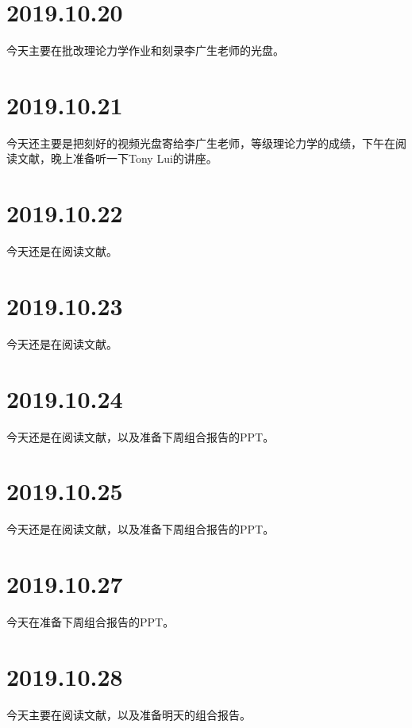 \section{2019.10.20}
今天主要在批改理论力学作业和刻录李广生老师的光盘。

\section{2019.10.21}
今天还主要是把刻好的视频光盘寄给李广生老师，等级理论力学的成绩，下午在阅读文献\cite{RN1176}，晚上准备听一下Tony Lui的讲座。

\section{2019.10.22}
今天还是在阅读文献\cite{RN1176}。

\section{2019.10.23}
今天还是在阅读文献\cite{RN1176}。

\section{2019.10.24}
今天还是在阅读文献\cite{RN1176}，以及准备下周组合报告的PPT。

\section{2019.10.25}
今天还是在阅读文献\cite{RN1176}，以及准备下周组合报告的PPT。

\section{2019.10.27}
今天在准备下周组合报告的PPT。

\section{2019.10.28}
今天主要在阅读文献\cite{RN1176}，以及准备明天的组合报告。
